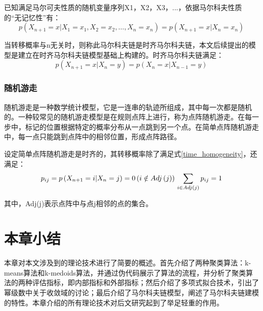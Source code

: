 已知满足马尔可夫性质的随机变量序列X1，X2，X3，...，依据马尔科夫性质的“无记忆性”有：
\begin{equation}
\label{markov_nature}
p\left(X_{n+1}=x | X_{1}=x_{1}, X_{2}=x_{2}, \ldots, X_{n}=x_{n}\right)=p\left(X_{n+1}=x | X_{n}=x_{n}\right)
\end{equation}

当转移概率与n无关时，则称此马尔科夫链是时齐马尔科夫链，本文后续提出的模型是建立在时齐马尔科夫链模型基础上构建的。时齐马尔科夫链满足：
\begin{equation}
\label{time_homogeneity}
p\left(X_{n+1}=x | X_{n}=y\right)=p\left(X_{n}=x | X_{n-1}=y\right)
\end{equation}

\subsubsection{随机游走}
随机游走是一种数学统计模型，它是一连串的轨迹所组成，其中每一次都是随机的。一种较常见的随机游走模型是在规则点阵上进行，称为点阵随机游走。在每一步中，标记的位置根据特定的概率分布从一点跳到另一个点。在简单点阵随机游走中，每一点只能跳到点阵中的相邻位置，形成点阵路径。

设定简单点阵随机游走是时齐的，其转移概率除了满足式\ref{time_homogeneity}，还满足：
\begin{equation}
\label{random_walk}
p_{ij}=p\left( X_{n+1}=i|X_n=j \right) =0 \left( i\notin Adj\left( j \right) \right) 
\\
\sum_{i\in Adj\left( j \right)}{p_{ij}=1}
\end{equation}

其中，Adj(j)表示点阵中与点j相邻的点的集合。

\section{本章小结}

本章对本文涉及到的理论技术进行了简要的概述。首先介绍了两种聚类算法：k-means算法和k-medoids算法，并通过伪代码展示了算法的流程，并分析了聚类算法的两种评估指标，即内部指标和外部指标；然后介绍了多项式拟合技术，引出了幂级数中关于收敛域的讨论；最后介绍了马尔科夫链模型，阐述了马尔科夫链建模的特性。本章介绍的所有理论技术对后文研究起到了举足轻重的作用。